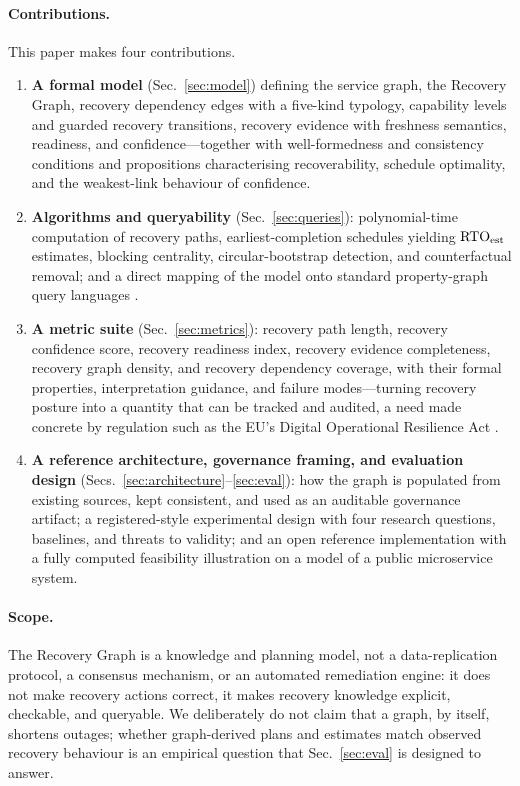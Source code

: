 \paragraph{Contributions.} This paper makes four contributions.
\begin{enumerate}[label=\textbf{C\arabic*.},leftmargin=2.6em,itemsep=2pt]
\item \textbf{A formal model} (Sec.~\ref{sec:model}) defining the service graph, the Recovery Graph, recovery dependency edges with a five-kind typology, capability levels and guarded recovery transitions, recovery evidence with freshness semantics, readiness, and confidence---together with well-formedness and consistency conditions and propositions characterising recoverability, schedule optimality, and the weakest-link behaviour of confidence.
\item \textbf{Algorithms and queryability} (Sec.~\ref{sec:queries}): polynomial-time computation of recovery paths, earliest-completion schedules yielding $\mathrm{RTO}_{\mathrm{est}}$ estimates, blocking centrality, circular-bootstrap detection, and counterfactual removal; and a direct mapping of the model onto standard property-graph query languages \citep{francis2018cypher,iso2024gql}.
\item \textbf{A metric suite} (Sec.~\ref{sec:metrics}): recovery path length, recovery confidence score, recovery readiness index, recovery evidence completeness, recovery graph density, and recovery dependency coverage, with their formal properties, interpretation guidance, and failure modes---turning recovery posture into a quantity that can be tracked and audited, a need made concrete by regulation such as the EU's Digital Operational Resilience Act \citep{eu2022dora}.
\item \textbf{A reference architecture, governance framing, and evaluation design} (Secs.~\ref{sec:architecture}--\ref{sec:eval}): how the graph is populated from existing sources, kept consistent, and used as an auditable governance artifact; a registered-style experimental design with four research questions, baselines, and threats to validity; and an open reference implementation with a fully computed feasibility illustration on a model of a public microservice system.
\end{enumerate}

\paragraph{Scope.} The Recovery Graph is a knowledge and planning model, not a data-replication protocol, a consensus mechanism, or an automated remediation engine: it does not make recovery actions correct, it makes recovery knowledge explicit, checkable, and queryable. We deliberately do not claim that a graph, by itself, shortens outages; whether graph-derived plans and estimates match observed recovery behaviour is an empirical question that Sec.~\ref{sec:eval} is designed to answer.

